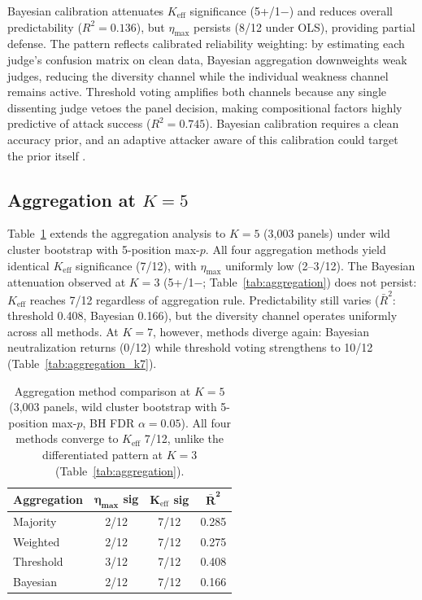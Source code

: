 Bayesian calibration attenuates $K_{\mathrm{eff}}$ significance (5+/1$-$) and reduces overall predictability ($R^2{=}0.136$), but $\eta_{\max}$ persists (8/12 under OLS), providing partial defense. The pattern reflects calibrated reliability weighting: by estimating each judge's confusion matrix on clean data, Bayesian aggregation downweights weak judges, reducing the diversity channel while the individual weakness channel remains active. Threshold voting amplifies both channels because any single dissenting judge vetoes the panel decision, making compositional factors highly predictive of attack success ($R^2{=}0.745$). Bayesian calibration requires a clean accuracy prior, and an adaptive attacker aware of this calibration could target the prior itself \citep{tambe2011security}.


\subsection{Aggregation at \texorpdfstring{$K{=}5$}{K=5}}
\label{app:aggregation_k5}

Table~\ref{tab:aggregation_k5} extends the aggregation analysis to $K{=}5$ (3{,}003 panels) under wild cluster bootstrap with 5-position max-$p$. All four aggregation methods yield identical $K_{\mathrm{eff}}$ significance (7/12), with $\eta_{\max}$ uniformly low (2--3/12). The Bayesian attenuation observed at $K{=}3$ (5+/1$-$; Table~\ref{tab:aggregation}) does not persist: $K_{\mathrm{eff}}$ reaches 7/12 regardless of aggregation rule. Predictability still varies ($\bar{R}^2$: threshold 0.408, Bayesian 0.166), but the diversity channel operates uniformly across all methods. At $K{=}7$, however, methods diverge again: Bayesian neutralization returns (0/12) while threshold voting strengthens to 10/12 (Table~\ref{tab:aggregation_k7}).

\begin{table}[h]
\centering
\small
\caption{Aggregation method comparison at $K{=}5$ (3{,}003 panels, wild cluster bootstrap with 5-position max-$p$, BH FDR $\alpha{=}0.05$). All four methods converge to $K_{\mathrm{eff}}$ 7/12, unlike the differentiated pattern at $K{=}3$ (Table~\ref{tab:aggregation}).}
\label{tab:aggregation_k5}
\begin{tabular}{lccc}
\toprule
\textbf{Aggregation} & $\boldsymbol{\eta_{\max}}$ \textbf{sig} & $\boldsymbol{K_{\mathrm{eff}}}$ \textbf{sig} & $\boldsymbol{\bar{R}^2}$ \\
\midrule
Majority   & 2/12  & 7/12 & 0.285 \\
Weighted   & 2/12  & 7/12 & 0.275 \\
Threshold  & 3/12  & 7/12 & 0.408 \\
Bayesian   & 2/12  & 7/12 & 0.166 \\
\bottomrule
\end{tabular}
\end{table}

